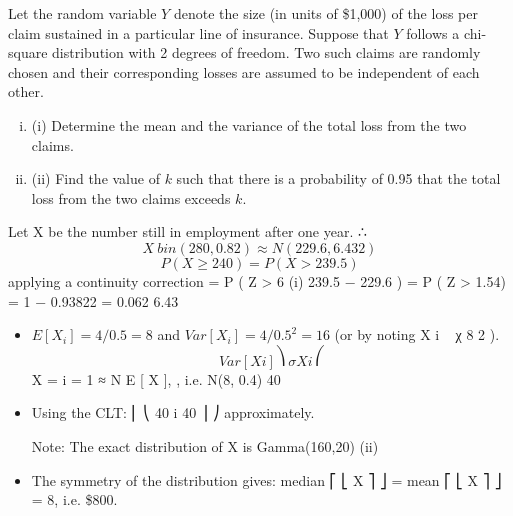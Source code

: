\documentclass[a4paper,12pt]{article}
\begin{document}
Let the random variable $Y$ denote the size (in units of \$1,000) of the loss per claim sustained in a particular line of insurance. Suppose that $Y$ follows a chi-square distribution with 2 degrees of freedom. Two such claims are randomly chosen and
their corresponding losses are assumed to be independent of each other.
\begin{enumerate}[(i)]
\item (i) Determine the mean and the variance of the total loss from the two claims. 
\item (ii) Find the value of $k$ such that there is a probability of 0.95 that the total loss from the two claims exceeds $k$.
\end{enumerate}


Let X be the number still in employment after one year.
∴ \[X ~ bin (280, 0.82) ≈ N (229.6, 6.43 2 )\]
\[P ( X \geq 240) = P ( X > 239.5)\] applying a continuity correction
= P ( Z >
6
(i)
239.5 − 229.6
) = P ( Z > 1.54) = 1 − 0.93822 = 0.062
6.43

\begin{itemize}


\item $E[X_i ] = 4/0.5 = 8$ and $Var[X_i ] = 4/0.5^2 = 16$ (or by noting X i ~ χ 8 2 ).
\[Var [ X i ] ⎞
\sigma X i ⎛\]
X = i = 1 ≈ N E [ X ],
, i.e. N(8, 0.4)
40
\item Using the CLT:
⎜
⎝
40
i
40
⎟
⎠
approximately.
\item [Note: The exact distribution of X is Gamma(160,20)]
(ii)
\item The symmetry of the distribution gives: median ⎡ ⎣ X ⎤ ⎦ = mean ⎡ ⎣ X ⎤ ⎦ = 8,
i.e. \$800.
\end{itemize}
\end{document}
